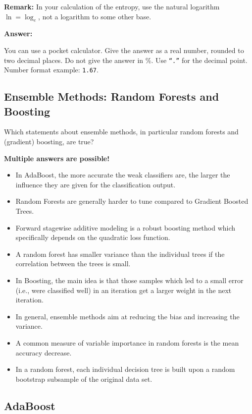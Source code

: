\documentclass{article}
\begin{document}
\textbf{Remark:} In your calculation of the entropy, use the natural logarithm \(\ln = \log_e\), not a logarithm to some other base.

\textbf{Answer:}

You can use a pocket calculator. Give the answer as a real number, rounded to two decimal places. Do not give the answer in \%. Use \texttt{``.''} for the decimal point. Number format example: \texttt{1.67}.

\subsection*{Ensemble Methods: Random Forests and Boosting}

Which statements about ensemble methods, in particular random forests and (gradient) boosting, are true?

\textbf{Multiple answers are possible!}

\begin{itemize}
    \item[(a)] In AdaBoost, the more accurate the weak classifiers are, the larger the influence they are given for the classification output.
    \item[(b)] Random Forests are generally harder to tune compared to Gradient Boosted Trees.
    \item[(c)] Forward stagewise additive modeling is a robust boosting method which specifically depends on the quadratic loss function.
    \item[(d)] A random forest has smaller variance than the individual trees if the correlation between the trees is small.
    \item[(e)] In Boosting, the main idea is that those samples which led to a small error (i.e., were classified well) in an iteration get a larger weight in the next iteration.
    \item[(f)] In general, ensemble methods aim at reducing the bias and increasing the variance.
    \item[(g)] A common measure of variable importance in random forests is the mean accuracy decrease.
    \item[(h)] In a random forest, each individual decision tree is built upon a random bootstrap subsample of the original data set.
\end{itemize}


\subsection*{AdaBoost}
\end{document}
